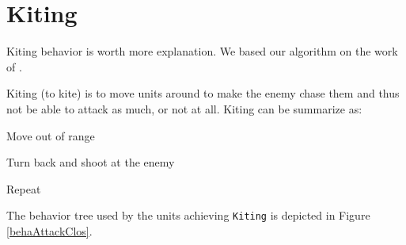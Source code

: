 \section{Kiting}
\label{kiting}

Kiting behavior is worth more explanation. 
We based our algorithm on the work of \cite{kiting}. 

\begin{definition}[Kiting]
    Kiting (to kite) is to move units around to make the enemy chase them and thus not be able to attack as much, or not at all. 
    Kiting can be summarize as:
    \begin{shortitem}
    \item Move out of range
    \item Turn back and shoot at the enemy
    \item Repeat
    \end{shortitem}
\end{definition}

The behavior tree used by the units achieving \texttt{Kiting} is depicted in Figure \ref{behaAttackClos}.

